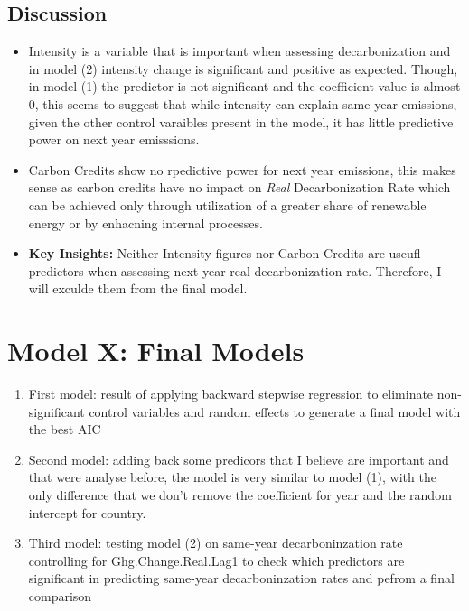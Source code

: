 

\subsection{Discussion}

\begin{itemize}
    \item Intensity is a variable that is important when assessing decarbonization and in model (2) intensity change is significant and positive as expected. Though, in model (1) the predictor is not significant and the coefficient value is almost $0$, this seems to suggest that while intensity can explain same-year emissions, given the other control varaibles present in the model, it has little predictive power on next year emisssions.
    \item Carbon Credits show no rpedictive power for next year emissions, this makes sense as carbon credits have no impact on \textit{Real} Decarbonization Rate which can be achieved only through utilization of a greater share of renewable energy or by enhacning internal processes.
    \item \textbf{Key Insights: } Neither Intensity figures nor Carbon Credits are useufl predictors when assessing next year real decarbonization rate. Therefore, I will exculde them from the final model.
\end{itemize}

\section{Model X: Final Models}


\begin{enumerate}
    \item First model: result of applying backward stepwise regression to eliminate non-significant control variables and random effects to generate a final model with the best AIC
    \item Second model: adding back some predicors that I believe are important and that were analyse before, the model is very similar to model (1), with the only difference that we don't remove the coefficient for year and the random intercept for country.
    \item Third model: testing model (2) on same-year decarboninzation rate controlling for Ghg.Change.Real.Lag1 to check which predictors are significant in predicting same-year decarboninzation rates and pefrom a final comparison
\end{enumerate}

